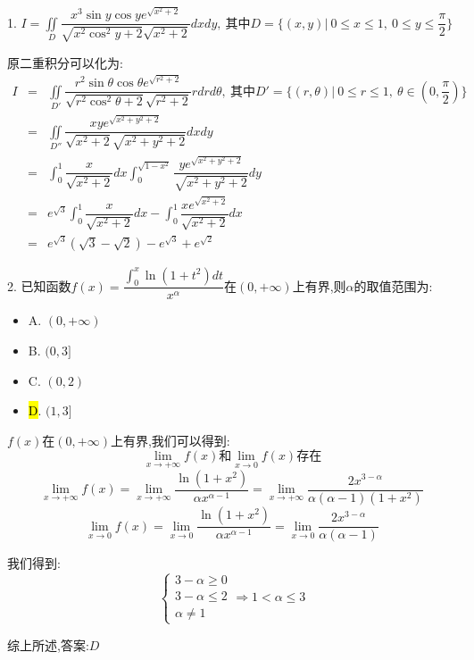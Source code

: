1. $I=\iint\limits_{D}\dfrac{x^3\sin y\cos y e^{\sqrt{x^2+2}}}{\sqrt{x^2\cos^2y+2}\sqrt{x^2+2}}dxdy,\ \text{其中}D=\{(x,y)|\ 0\leq x\leq 1,\ 0\leq y\leq \dfrac{\pi}{2}\}$
\begin{solution}
	
	原二重积分可以化为: 
	\begin{eqnarray*}
		I&=&\iint\limits_{D'}\dfrac{r^2\sin \theta\cos \theta e^{\sqrt{r^2+2}}}{\sqrt{r^2\cos^2\theta+2}\sqrt{r^2+2}}rdrd\theta,\ \text{其中}D'=\{(r,\theta)|\ 0\leq r\leq 1,\ \theta\in(0,\dfrac{\pi}{2})\}\\
		&=&\iint\limits_{D''}\dfrac{xye^{\sqrt{x^2+y^2+2}}}{\sqrt{x^2+2}\sqrt{x^2+y^2+2}}dxdy\\
		&=&\int_{0}^{1}\dfrac{x}{\sqrt{x^2+2}}dx\int_{0}^{\sqrt{1-x^2}}\dfrac{ye^{\sqrt{x^2+y^2+2}}}{\sqrt{x^2+y^2+2}}dy\\
		&=&e^{\sqrt{3}}\int_{0}^{1}\dfrac{x}{\sqrt{x^2+2}}dx-\int_{0}^{1}\dfrac{xe^{\sqrt{x^2+2}}}{\sqrt{x^2+2}}dx\\
		&=&e^{\sqrt{3}}(\sqrt{3}-\sqrt{2})-e^{\sqrt{3}}+e^{\sqrt{2}}
	\end{eqnarray*}
\end{solution}


2. 已知函数$f(x)=\dfrac{\int_{0}^{x}\ln(1+t^2)dt}{x^{\alpha}}$在$(0,+\infty)$上有界,则$\alpha$的取值范围为: 

\begin{itemize}
	\item A. $(0,+\infty)$ 
	\item B. $(0,3]$ 
	\item C. $(0,2)$ 
	\item \hl{D}. $(1,3]$ 
\end{itemize}
\begin{solution}
	
	$f(x)$在$(0,+\infty)$上有界,我们可以得到: 
	$$\lim\limits_{x\rightarrow +\infty}f(x)\text{和}\lim\limits_{x\rightarrow 0}f(x)\text{存在}$$
	$$\lim\limits_{x\rightarrow +\infty}f(x)=\lim\limits_{x\rightarrow +\infty}\dfrac{\ln(1+x^2)}{\alpha x^{\alpha-1}}=\lim\limits_{x\rightarrow +\infty}\dfrac{2x^{3-\alpha}}{\alpha(\alpha-1)(1+x^2)}$$
	$$\lim\limits_{x\rightarrow 0}f(x)=\lim\limits_{x\rightarrow 0}\dfrac{\ln(1+x^2)}{\alpha x^{\alpha-1}}=\lim\limits_{x\rightarrow 0}\dfrac{2x^{3-\alpha}}{\alpha(\alpha-1)}$$
	
	我们得到: 
	$$\left\lbrace 
	\begin{array}{l}
		3-\alpha\geq 0\\
		3-\alpha\leq 2\\
		\alpha\neq 1
	\end{array}
	\right. \Rightarrow 1<\alpha\leq 3$$
	
	综上所述,答案:$D$
\end{solution}

